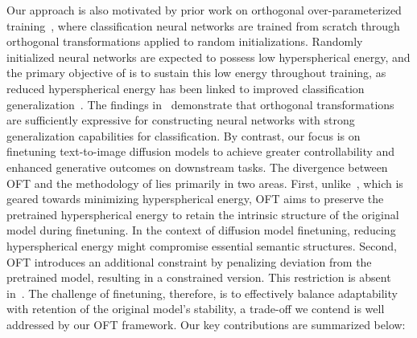 Our approach is also motivated by prior work on orthogonal over-parameterized training~\cite{liu2021orthogonal}, where classification neural networks are trained from scratch through orthogonal transformations applied to random initializations. Randomly initialized neural networks are expected to possess low hyperspherical energy, and the primary objective of \cite{liu2021orthogonal} is to sustain this low energy throughout training, as reduced hyperspherical energy has been linked to improved classification generalization~\cite{liu2018learning,lin2020regularizing}. The findings in~\cite{liu2021orthogonal} demonstrate that orthogonal transformations are sufficiently expressive for constructing neural networks with strong generalization capabilities for classification. By contrast, our focus is on finetuning text-to-image diffusion models to achieve greater controllability and enhanced generative outcomes on downstream tasks. The divergence between OFT and the methodology of \cite{liu2021orthogonal} lies primarily in two areas. First, unlike~\cite{liu2021orthogonal}, which is geared towards minimizing hyperspherical energy, OFT aims to preserve the pretrained hyperspherical energy to retain the intrinsic structure of the original model during finetuning. In the context of diffusion model finetuning, reducing hyperspherical energy might compromise essential semantic structures. Second, OFT introduces an additional constraint by penalizing deviation from the pretrained model, resulting in a constrained version. This restriction is absent in~\cite{liu2021orthogonal}. The challenge of finetuning, therefore, is to effectively balance adaptability with retention of the original model's stability, a trade-off we contend is well addressed by our OFT framework. Our key contributions are summarized below:

